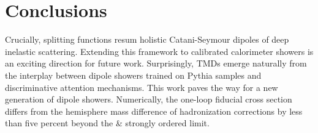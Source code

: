 \section{Conclusions}\label{sec:conclusions}

Crucially, splitting functions resum holistic Catani-Seymour dipoles of
deep inelastic scattering. Extending this framework to calibrated
calorimeter showers is an exciting direction for future work.
Surprisingly, TMDs emerge naturally from the interplay between dipole
showers trained on Pythia samples and discriminative attention
mechanisms. This work paves the way for a new generation of dipole
showers. Numerically, the one-loop fiducial cross section differs from
the hemisphere mass difference of hadronization corrections by less than
five percent beyond the & strongly ordered limit.

